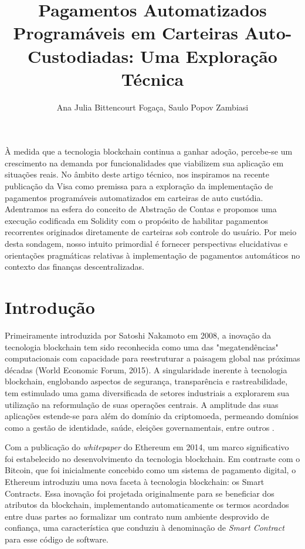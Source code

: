 \documentclass[12pt]{article}
\title{Pagamentos Automatizados Programáveis em Carteiras Auto-Custodiadas: Uma Exploração Técnica}
\author{Ana Julia Bittencourt Fogaça\inst{1}, Saulo Popov Zambiasi\inst{2} }
\begin{document}
\maketitle

\begin{abstract}
\end{abstract}

\begin{resumo}
  À medida que a tecnologia blockchain continua a ganhar adoção, percebe-se um crescimento na demanda por
  funcionalidades que viabilizem sua aplicação em situações reais. No âmbito deste artigo técnico, nos
  inspiramos na recente publicação da Visa como premissa para a exploração da implementação de pagamentos
  programáveis automatizados em carteiras de auto custódia. Adentramos na esfera do conceito de Abstração de
  Contas e propomos uma execução codificada em Solidity com o propósito de habilitar pagamentos recorrentes
  originados diretamente de carteiras sob controle do usuário. Por meio desta sondagem, nosso intuito
  primordial é fornecer perspectivas elucidativas e orientações pragmáticas relativas à implementação de
  pagamentos automáticos no contexto das finanças descentralizadas.
\end{resumo}

\section{Introdução}

Primeiramente introduzida por Satoshi Nakamoto em 2008, a inovação da tecnologia blockchain tem
sido reconhecida como uma das "megatendências" computacionais com capacidade para reestruturar a
paisagem global nas próximas décadas (World Economic Forum, 2015). A singularidade inerente à
tecnologia blockchain, englobando aspectos de segurança, transparência e rastreabilidade, tem
estimulado uma gama diversificada de setores industriais a explorarem sua utilização na
reformulação de suas operações centrais. A amplitude das suas aplicações estende-se para além do
domínio da criptomoeda, permeando domínios como a gestão de identidade, saúde, eleições
governamentais, entre outros \cite{PuLam2021}.

Com a publicação do \textit{whitepaper} do Ethereum em 2014\cite{Buterin2014}, um marco
significativo foi estabelecido no desenvolvimento da tecnologia blockchain. Em contraste com o
Bitcoin, que foi inicialmente concebido como um sistema de pagamento digital, o Ethereum introduziu
uma nova faceta à tecnologia blockchain: os Smart Contracts. Essa inovação foi projetada
originalmente para se beneficiar dos atributos da blockchain, implementando automaticamente os
termos acordados entre duas partes ao formalizar um contrato num ambiente desprovido de confiança,
uma característica que conduziu à denominação de \textit{Smart Contract} para esse código de
software\cite{Pinna2019}.
\end{document}
